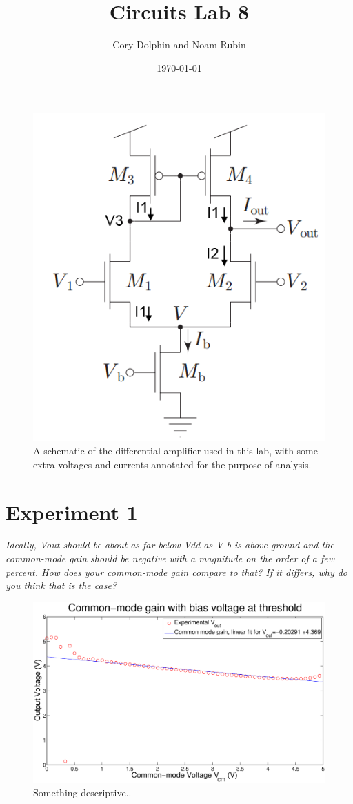 \documentclass{article}
\title{Circuits Lab 8}
\author{Cory Dolphin and Noam Rubin}
\date{\today}
\begin{document}
\maketitle

\begin{figure}[H]
\centering
\includegraphics[width=0.6\linewidth]{../Figures/Lab8Schematic}
\caption{A schematic of the differential amplifier used in this lab, with some extra voltages and currents annotated for the purpose of analysis.}
\label{fig:lab8schem}
\end{figure}


\section*{Experiment 1}


\textit{Ideally, Vout should be about as far below Vdd as V b is above ground and the
common-mode gain should be negative with a magnitude on the order of a few percent. How
does your common-mode gain compare to that? If it differs, why do you think that is the
case?}

\begin{figure}[H]
\centering
\includegraphics[width=\linewidth]{../Figures/Exp1P1.eps}
\caption{Something descriptive..}
\label{fig:exp1p1}
\end{figure}
\end{document}
